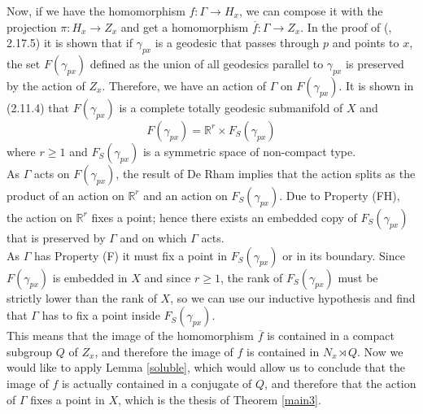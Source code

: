 \documentclass{article}
\theoremstyle{definition}
\theoremstyle{remark}
\theoremstyle{plain}
\begin{document}
Now, if we have the homomorphism $f: \Gamma\rightarrow H_x$, we can compose it with the projection $\pi: H_x\rightarrow Z_x$ and get a homomorphism $\overline{f}: \Gamma\rightarrow Z_x$. In the proof of (\cite{eberlein}, 2.17.5) it is shown that if $\gamma_{px}$ is a geodesic that passes through $p$ and points to $x$, the set $F(\gamma_{px})$ defined as the union of all geodesics parallel to $\gamma_{px}$ is preserved by the action of $Z_x$. Therefore, we have an action of $\Gamma$ on $F(\gamma_{px})$. It is shown in \cite{eberlein} (2.11.4) that $F(\gamma_{px})$ is a complete totally geodesic submanifold of $X$ and $$F(\gamma_{px})=\mathbb{R}^r\times F_S(\gamma_{px})$$ where $r\geq 1$ and $F_S(\gamma_{px})$ is a symmetric space of non-compact type. \\

As $\Gamma$ acts on $F(\gamma_{px})$, the result of De Rham \cite{derham} implies that the action splits as the product of an action on $\mathbb{R}^r$ and an action on $F_S(\gamma_{px})$. Due to Property (FH), the action on $\mathbb{R}^r$ fixes a point; hence there exists an embedded copy of $F_S(\gamma_{px})$ that is preserved by $\Gamma$ and on which $\Gamma$ acts. \\

As $\Gamma$ has Property (F) it must fix a point in $F_S(\gamma_{px})$ or in its boundary. Since $F(\gamma_{px})$ is embedded in $X$ and since $r\geq 1$, the rank of $F_S(\gamma_{px})$ must be strictly lower than the rank of $X$, so we can use our inductive hypothesis and find that $\Gamma$ has to fix a point inside $F_S(\gamma_{px})$. \\

This means that the image of the homomorphism $\overline{f}$ is contained in a compact subgroup $Q$ of $Z_x$, and therefore the image of $f$ is contained in $N_x\rtimes Q$. Now we would like to apply Lemma \ref{soluble}, which would allow us to conclude that the image of $f$ is actually contained in a conjugate of $Q$, and therefore that the action of $\Gamma$ fixes a point in $X$, which is the thesis of Theorem \ref{main3}. \\
\end{document}

